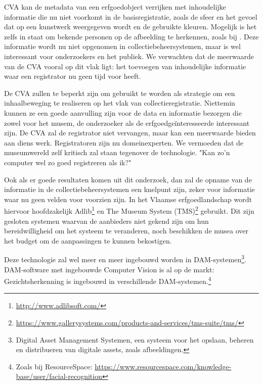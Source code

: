 \documentclass[fleqn,10pt]{voorstel}
\begin{document}
CVA kan de metadata van een erfgoedobject verrijken met inhoudelijke informatie die nu niet voorkomt in de basisregistratie, zoals de sfeer en het gevoel dat op een kunstwerk weergegeven wordt en de gebruikte kleuren. Mogelijk is het zelfs in staat om bekende personen op de afbeelding te herkennen, zoals bij \textcite{Hindle2017}. Deze informatie wordt nu niet opgenomen in collectiebeheersystemen, maar is wel interessant voor onderzoekers en het publiek. We verwachten dat de meerwaarde van de CVA vooral op dit vlak ligt: het toevoegen van inhoudelijke informatie waar een registrator nu geen tijd voor heeft. 

De CVA zullen te beperkt zijn om gebruikt te worden als strategie om een inhaalbeweging te realiseren op het vlak van collectieregistratie. Niettemin kunnen ze een goede aanvulling zijn voor de data en informatie bezorgen die zowel voor het musem, de onderzoeker als de erfgoedge\"interesseerde interessant zijn. De CVA zal de registrator niet vervangen, maar kan een meerwaarde bieden aan diens werk. Registratoren zijn nu domeinexperten. We vermoeden dat de museumwereld zelf kritisch zal staan tegenover de technologie. "Kan zo'n computer wel zo goed registreren als ik?"

Ook als er goede resultaten komen uit dit onderzoek, dan zal de opname van de informatie in de collectiebeheersystemen een knelpunt zijn, zeker voor informatie waar nu geen velden voor voorzien zijn. In het Vlaamse erfgoedlandschap wordt hiervoor hoofdzakelijk Adlib\footnote{\url{http://www.adlibsoft.com/}} en The Museum System (TMS)\footnote{\url{https://www.gallerysystems.com/products-and-services/tms-suite/tms/}} gebruikt. Dit zijn gesloten systemen waarvan de aanbieders niet gekend zijn om hun bereidwilligheid om het systeem te veranderen, noch beschikken de musea over het budget om de aanpassingen te kunnen bekostigen.

Deze technologie zal wel meer en meer ingebouwd worden in DAM-systemen\footnote{Digital Asset Management Systemen, een systeem voor het opslaan, beheren en distribueren van digitale assets, zoals afbeeldingen.}. DAM-software met ingebouwde Computer Vision is al op de markt: Gezichtsherkenning is ingebouwd in verschillende DAM-systemen.\footnote{Zoals bij ResourceSpace: \url{https://www.resourcespace.com/knowledge-base/user/facial-recognition}}






\printbibliography[heading=bibintoc]
\end{document}
